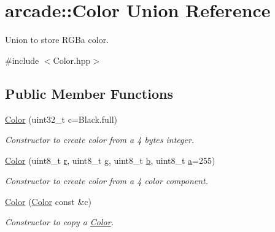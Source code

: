 \hypertarget{unionarcade_1_1_color}{}\section{arcade\+:\+:Color Union Reference}
\label{unionarcade_1_1_color}


Union to store R\+G\+Ba color.  




{\ttfamily \#include $<$Color.\+hpp$>$}

\subsection*{Public Member Functions}
\begin{DoxyCompactItemize}
\item 
\hyperlink{unionarcade_1_1_color_a053784aa4df3917111e2717d74fa3d85}{Color} (uint32\+\_\+t c=Black.\+full)
\begin{DoxyCompactList}\small\item\em Constructor to create color from a 4 bytes integer. \end{DoxyCompactList}\item 
\hyperlink{unionarcade_1_1_color_acf519d304c0dae64e28b976414af0753}{Color} (uint8\+\_\+t \hyperlink{unionarcade_1_1_color_a20637c0cb142a384bd034cceacafe6e0}{r}, uint8\+\_\+t \hyperlink{unionarcade_1_1_color_a97c509df99c9b119622f4b2ff8b3f21b}{g}, uint8\+\_\+t \hyperlink{unionarcade_1_1_color_a7edec98cabcfdeb71ae750e7442a6baf}{b}, uint8\+\_\+t \hyperlink{unionarcade_1_1_color_ae2f888f27d844d24f9ef10917f42d2dc}{a}=255)
\begin{DoxyCompactList}\small\item\em Constructor to create color from a 4 color component. \end{DoxyCompactList}\item 
\hyperlink{unionarcade_1_1_color_a25345f417c09d13da1b20f5a0f030eec}{Color} (\hyperlink{unionarcade_1_1_color}{Color} const \&c)
\begin{DoxyCompactList}\small\item\em Constructor to copy a \hyperlink{unionarcade_1_1_color}{Color}. \end{DoxyCompactList}\end{DoxyCompactItemize}
